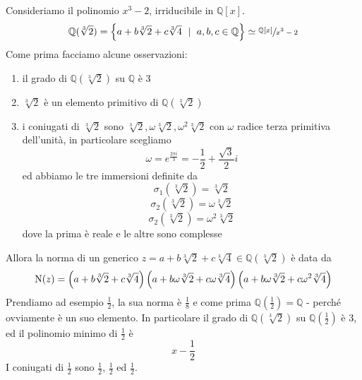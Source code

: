 \begin{esempio}
	Consideriamo il polinomio $x^3-2$, irriducibile in $\mathbb{Q}[x]$.
	\begin{equation*}
	\mathbb{Q}(\sqrt[3]{2})=\left\{a+b\sqrt[3]{2}+c\sqrt[3]{4} \ \mid \ a,b,c\in\mathbb{Q}\right\}\simeq\sfrac{\mathbb{Q}[x]}{x^3-2}
	\end{equation*}
	Come prima facciamo alcune osservazioni:
	\begin{enumerate}
		\item il grado di $\mathbb{Q}(\sqrt[3]{2})$ su $\mathbb{Q}$ è 3
		\item $\sqrt[3]{2}$ è un elemento primitivo di $\mathbb{Q}(\sqrt[3]{2})$
		\item i coniugati di $\sqrt[3]{2}$ sono $\sqrt[3]{2},\omega\sqrt[3]{2},\omega^2\sqrt[3]{2}$ con $\omega$ radice terza primitiva dell'unità, in particolare scegliamo
		\begin{equation*}
		\omega=e^{\frac{2\pi i}{3}}=-\frac{1}{2}+\frac{\sqrt{3}}{2}i
		\end{equation*}
		ed abbiamo le tre immersioni definite da
		\begin{equation*}
			\sigma_1(\sqrt[3]{2})=\sqrt[3]{2}
		\end{equation*}
		\begin{equation*}
			\sigma_2(\sqrt[3]{2})=\omega\sqrt[3]{2}
		\end{equation*}
		\begin{equation*}
			\sigma_2(\sqrt[3]{2})=\omega^2\sqrt[3]{2}
		\end{equation*}
		dove la prima è reale e le altre sono complesse
	\end{enumerate}
		Allora la norma di un generico $z=a+b\sqrt[3]{2}+c\sqrt[3]{4}\in\mathbb{Q}(\sqrt[3]{2})$ è data da 
		\begin{equation*}
		\operatorname{N}(z)=
		\left(a+b\sqrt[3]{2}+c\sqrt[3]{4}\right)
		\left(a+b\omega\sqrt[3]{2}+c\omega\sqrt[3]{4}\right)
		\left(a+b\omega\sqrt[3]{2}+c\omega^2\sqrt[3]{4}\right)
		\end{equation*}
		Prendiamo ad esempio $\frac{1}{2}$, la sua norma è $\frac{1}{8}$ e come prima $\mathbb{Q}(\frac{1}{2})=\mathbb{Q}$ - perché ovviamente è un suo elemento. In particolare il grado di $\mathbb{Q}(\sqrt[3]{2})$ su $\mathbb{Q}(\frac{1}{2})$ è 3, ed il polinomio minimo di $\frac{1}{2}$ è 
		\begin{equation*}
		x-\frac{1}{2}
		\end{equation*}
		I coniugati di $\frac{1}{2}$ sono $\frac{1}{2}$, $\frac{1}{2}$ ed $\frac{1}{2}$.
\end{esempio}
